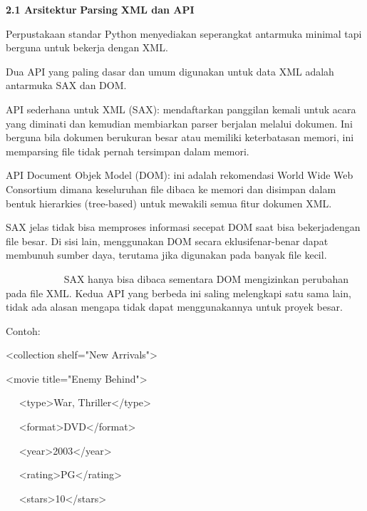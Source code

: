 \vspace{12pt}
\noindent 
\textbf{2.1 Arsitektur }\textbf{Parsing}\textbf{ XML dan API} \par
\noindent 
 \hspace*{0.5in} Perpustakaan standar Python menyediakan seperangkat antarmuka minimal tapi berguna untuk bekerja dengan XML.  \par
\noindent 
 \hspace*{0.5in} Dua API yang paling dasar dan umum digunakan untuk data XML adalah antarmuka SAX dan DOM. \par
\noindent 
 \hspace*{0.5in} API sederhana untuk XML (SAX): mendaftarkan panggilan kemali untuk acara yang diminati dan kemudian membiarkan parser berjalan melalui dokumen. Ini berguna bila dokumen berukuran besar atau memiliki keterbatasan memori, ini memparsing file tidak pernah tersimpan dalam memori. \par
\noindent 
 \hspace*{0.5in} API Document Objek Model (DOM): ini adalah rekomendasi World Wide Web Consortium dimana keseluruhan file dibaca ke memori dan disimpan dalam bentuk hierarkies (tree-based) untuk mewakili semua fitur dokumen XML.  \par
\noindent 
 \hspace*{0.5in} SAX jelas tidak bisa memproses informasi secepat DOM saat bisa bekerjadengan file besar. Di sisi lain, menggunakan DOM secara eklusifenar-benar dapat membunuh sumber daya, terutama jika digunakan pada banyak file kecil. \par
\noindent 
~~~~~~~~~~~ SAX hanya bisa dibaca sementara DOM mengizinkan perubahan pada file XML. Kedua API yang berbeda ini saling melengkapi satu sama lain, tidak ada alasan mengapa tidak dapat menggunakannya untuk proyek besar. \par
\vspace{12pt}
\noindent 
Contoh: \par
\noindent 
<collection shelf="New Arrivals"> \par
\noindent 
<movie title="Enemy Behind"> \par
\noindent 
~~ <type>War, Thriller</type> \par
\noindent 
~~ <format>DVD</format> \par
\noindent 
~~ <year>2003</year> \par
\noindent 
~~ <rating>PG</rating> \par
\noindent 
~~ <stars>10</stars> \par

